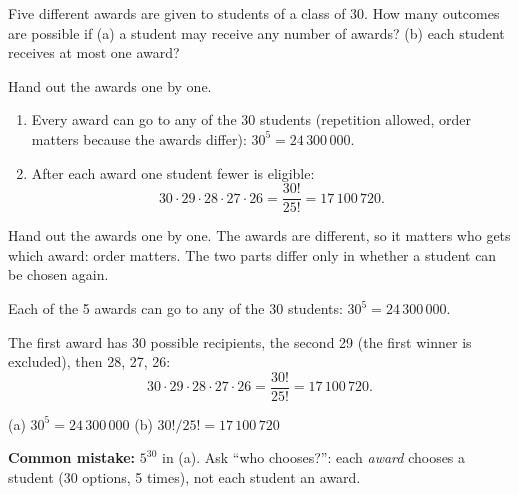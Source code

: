 
\begin{problem}
	Five different awards are given to students of a class of 30. How many
	outcomes are possible if (a) a student may receive any number of awards?
	(b) each student receives at most one award?
\end{problem}

\begin{slides}
	\small
	\exstatement
	\pause
	\sol Hand out the awards one by one.
	\begin{enumerate}
		\item[(a)] Every award can go to any of the 30 students (repetition
		      allowed, order matters because the awards differ):
		      $30^5 = 24\,300\,000$.
		\item[(b)] After each award one student fewer is eligible:
		      \[ 30\cdot29\cdot28\cdot27\cdot26 = \frac{30!}{25!} = 17\,100\,720. \]
	\end{enumerate}
\end{slides}

\begin{solution}
	\idea Hand out the awards one by one. The awards are different, so it
	matters who gets which award: order matters. The two parts differ only in
	whether a student can be chosen again.

	 Each of the 5 awards can go to any of the 30 students:
	$30^5 = 24\,300\,000$.

	 The first award has 30 possible recipients, the second 29 (the
	first winner is excluded), then 28, 27, 26:
	\[ 30\cdot29\cdot28\cdot27\cdot26 = \frac{30!}{25!} = 17\,100\,720. \]
	\begin{answer}
		(a) $30^5=24\,300\,000$ \qquad (b) $30!/25!=17\,100\,720$
	\end{answer}
	\begin{remark}
		\textbf{Common mistake:} $5^{30}$ in (a). Ask ``who chooses?'': each
		\emph{award} chooses a student (30 options, 5 times), not each student an
		award.
	\end{remark}
\end{solution}
